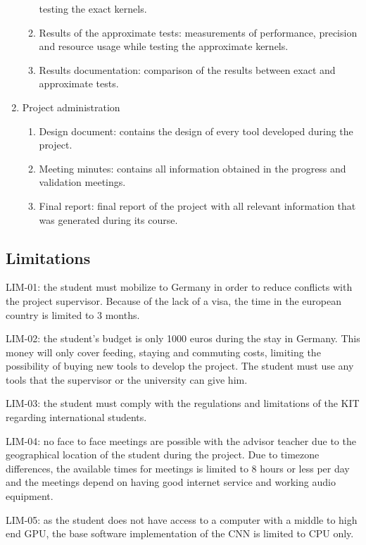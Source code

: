 \begin{enumerate}
\begin{enumerate}
            testing the exact kernels.
            \item Results of the approximate tests: measurements of performance, precision and resource usage while
            testing the approximate kernels.
            \item Results documentation: comparison of the results between exact and approximate tests.
        \end{enumerate}
    \item Project administration
        \begin{enumerate}
            \item Design document: contains the design of every tool developed during the project.
            \item Meeting minutes: contains all information obtained in the progress and validation
            meetings.
            \item Final report: final report of the project with all relevant information that was
            generated during its course.
        \end{enumerate}
    
\end{enumerate}

\subsection{Limitations}

LIM-01: the student must mobilize to Germany in order to reduce conflicts with the project supervisor.
Because of the lack of a visa, the time in the european country is limited to 3 months. 
 
LIM-02:​ the student's budget is only 1000 euros during the stay in Germany. This money will only cover feeding, staying and commuting costs,
limiting the possibility of buying new tools to develop the project. The student must use any tools that the supervisor or the university
can give him.

LIM-03: the student must comply with the regulations and limitations of the KIT regarding international
students.

LIM-04: no face to face meetings are possible with the advisor teacher due to the geographical location of 
the student during the project. Due to timezone differences, the available times for meetings is limited
to 8 hours or less per day and the meetings depend on having good internet service and working
audio equipment.

LIM-05: as the student does not have access to a computer with a middle to high end GPU, the base software
implementation of the CNN is limited to CPU only.


